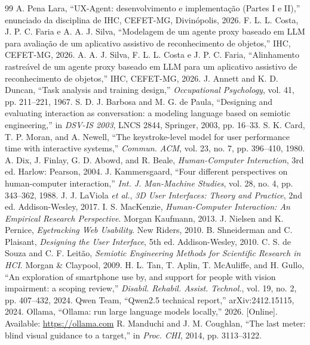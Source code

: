 \documentclass[conference]{IEEEtran}
\begin{document}
\begin{thebibliography}{99}\footnotesize
{} A. Pena Lara, ``UX-Agent: desenvolvimento e implementação (Partes I e II),'' enunciado da disciplina de IHC, CEFET-MG, Divinópolis, 2026.
 F. L. L. Costa, J. P. C. Faria e A. A. J. Silva, ``Modelagem de um agente proxy baseado em LLM para avaliação de um aplicativo assistivo de reconhecimento de objetos,'' IHC, CEFET-MG, 2026.
 A. A. J. Silva, F. L. L. Costa e J. P. C. Faria, ``Alinhamento rastreável de um agente proxy baseado em LLM para um aplicativo assistivo de reconhecimento de objetos,'' IHC, CEFET-MG, 2026.
 J. Annett and K. D. Duncan, ``Task analysis and training design,'' \emph{Occupational Psychology}, vol. 41, pp. 211--221, 1967.
 S. D. J. Barbosa and M. G. de Paula, ``Designing and evaluating interaction as conversation: a modeling language based on semiotic engineering,'' in \emph{DSV-IS 2003}, LNCS 2844, Springer, 2003, pp. 16--33.
 S. K. Card, T. P. Moran, and A. Newell, ``The keystroke-level model for user performance time with interactive systems,'' \emph{Commun. ACM}, vol. 23, no. 7, pp. 396--410, 1980.
 A. Dix, J. Finlay, G. D. Abowd, and R. Beale, \emph{Human-Computer Interaction}, 3rd ed. Harlow: Pearson, 2004.
 J. Kammersgaard, ``Four different perspectives on human-computer interaction,'' \emph{Int. J. Man-Machine Studies}, vol. 28, no. 4, pp. 343--362, 1988.
 J. J. LaViola \emph{et al.}, \emph{3D User Interfaces: Theory and Practice}, 2nd ed. Addison-Wesley, 2017.
 I. S. MacKenzie, \emph{Human-Computer Interaction: An Empirical Research Perspective}. Morgan Kaufmann, 2013.
 J. Nielsen and K. Pernice, \emph{Eyetracking Web Usability}. New Riders, 2010.
 B. Shneiderman and C. Plaisant, \emph{Designing the User Interface}, 5th ed. Addison-Wesley, 2010.
 C. S. de Souza and C. F. Leitão, \emph{Semiotic Engineering Methods for Scientific Research in HCI}. Morgan \& Claypool, 2009.
 H. L. Tan, T. Aplin, T. McAuliffe, and H. Gullo, ``An exploration of smartphone use by, and support for people with vision impairment: a scoping review,'' \emph{Disabil. Rehabil. Assist. Technol.}, vol. 19, no. 2, pp. 407--432, 2024.
 Qwen Team, ``Qwen2.5 technical report,'' arXiv:2412.15115, 2024.
 Ollama, ``Ollama: run large language models locally,'' 2026. [Online]. Available: \url{https://ollama.com}
 R. Manduchi and J. M. Coughlan, ``The last meter: blind visual guidance to a target,'' in \emph{Proc. CHI}, 2014, pp. 3113--3122.
\end{thebibliography}
\end{document}
